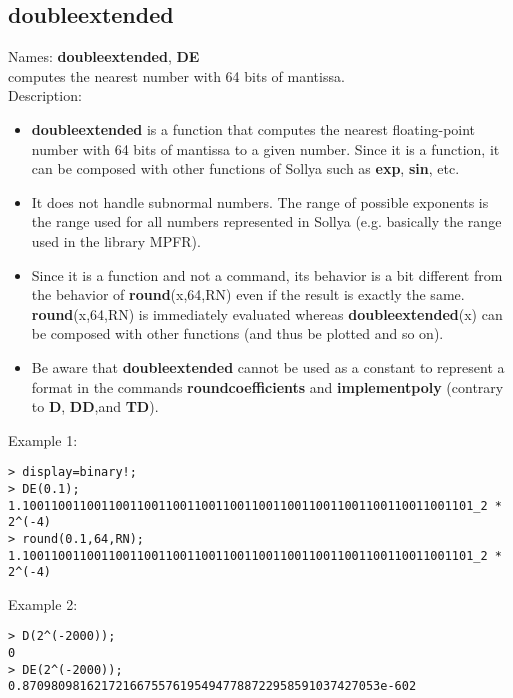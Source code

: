 \subsection{doubleextended}
\label{labdoubleextended}
\noindent Names: \textbf{doubleextended}, \textbf{DE}\\
computes the nearest number with 64 bits of mantissa.\\

\noindent Description: \begin{itemize}

\item \textbf{doubleextended} is a function that computes the nearest floating-point number with
   64 bits of mantissa to a given number. Since it is a function, it can be
   composed with other functions of Sollya such as \textbf{exp}, \textbf{sin}, etc.

\item It does not handle subnormal numbers. The range of possible exponents is the 
   range used for all numbers represented in Sollya (e.g. basically the range 
   used in the library MPFR).

\item Since it is a function and not a command, its behavior is a bit different from 
   the behavior of \textbf{round}(x,64,RN) even if the result is exactly the same.
   \textbf{round}(x,64,RN) is immediately evaluated whereas \textbf{doubleextended}(x) can be composed 
   with other functions (and thus be plotted and so on).

\item Be aware that \textbf{doubleextended} cannot be used as a constant to represent a format in the
   commands \textbf{roundcoefficients} and \textbf{implementpoly} (contrary to \textbf{D}, \textbf{DD},and \textbf{TD}).
\end{itemize}
\noindent Example 1: 
\begin{center}\begin{minipage}{15cm}\begin{Verbatim}[frame=single]
> display=binary!;
> DE(0.1);
1.100110011001100110011001100110011001100110011001100110011001101_2 * 2^(-4)
> round(0.1,64,RN);
1.100110011001100110011001100110011001100110011001100110011001101_2 * 2^(-4)
\end{Verbatim}
\end{minipage}\end{center}
\noindent Example 2: 
\begin{center}\begin{minipage}{15cm}\begin{Verbatim}[frame=single]
> D(2^(-2000));
0
> DE(2^(-2000));
0.87098098162172166755761954947788722958591037427053e-602
\end{Verbatim}
\end{minipage}\end{center}
